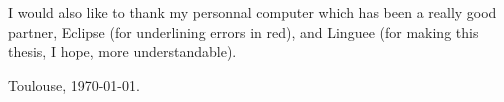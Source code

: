 I would also like to thank my personnal computer which has been a really good partner, 
Eclipse (for underlining errors in red), and Linguee (for making this thesis, I hope, more understandable).



\vspace{2cm}

\hfill Toulouse, \today.

